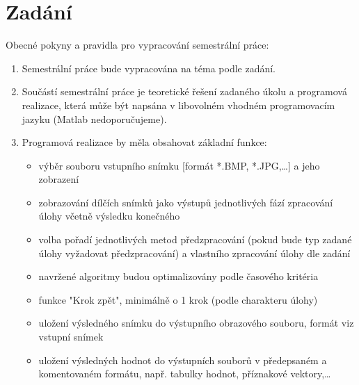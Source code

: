 \documentclass[12pt, a4paper]{report}
\begin{document}
\chapter{Zadání}
Obecné pokyny a pravidla pro vypracování semestrální práce:
\begin{enumerate}
	\item{Semestrální práce bude vypracována na téma podle zadání.}
	\item{Součástí semestrální práce je teoretické řešení zadaného úkolu a programová realizace, která
může být napsána v libovolném vhodném programovacím jazyku (Matlab nedoporučujeme).}
	\item Programová realizace by měla obsahovat základní funkce:
	\begin{itemize}
		\item{výběr souboru vstupního snímku [formát *.BMP, *.JPG,…] a jeho zobrazení}
		\item{zobrazování dílčích snímků jako výstupů jednotlivých fází zpracování úlohy včetně výsledku
konečného}
		\item{volba pořadí jednotlivých metod předzpracování (pokud bude typ zadané úlohy vyžadovat
předzpracování) a vlastního zpracování úlohy dle zadání}
		\item{navržené algoritmy budou optimalizovány podle časového kritéria}
		\item{funkce "Krok zpět", minimálně o 1 krok (podle charakteru úlohy)}
		\item{uložení výsledného snímku do výstupního obrazového souboru, formát viz vstupní snímek}
		\item{uložení výsledných hodnot do výstupních souborů v předepsaném a komentovaném formátu,
např. tabulky hodnot, příznakové vektory,…}
	\end{itemize}


\end{enumerate}
\end{document}
